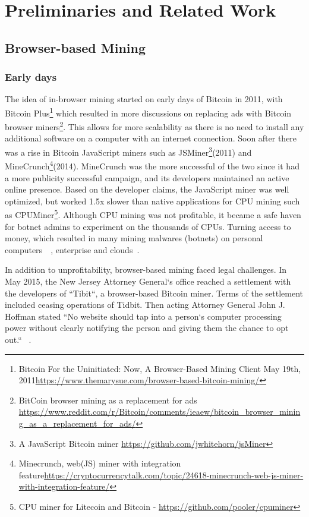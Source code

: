 
\section{Preliminaries and Related Work}

\subsection{Browser-based Mining}

\subsubsection{Early days}
The idea of in-browser mining started on early days of Bitcoin in 2011, with Bitcoin Plus\footnote{Bitcoin For the Uninitiated: Now, A Browser-Based Mining Client  May 19th, 2011\url{https://www.themarysue.com/browser-based-bitcoin-mining/}} which resulted in more discussions on replacing ads with Bitcoin browser miners\footnote{BitCoin browser mining as a replacement for ads \url{https://www.reddit.com/r/Bitcoin/comments/ieaew/bitcoin_browser_mining_as_a_replacement_for_ads/}}. This allows for more scalability as there is no need to install any additional software on a computer with an internet connection. Soon after there was a rise in Bitcoin JavaScript miners such as JSMiner\footnote{A JavaScript Bitcoin miner \url{https://github.com/jwhitehorn/jsMiner}}(2011) and MineCrunch\footnote{Minecrunch, web(JS) miner with integration feature\url{https://cryptocurrencytalk.com/topic/24618-minecrunch-web-js-miner-with-integration-feature/}}(2014). MineCrunch was the more successful of the two since it had a more publicity successful campaign, and its developers maintained an active online presence. Based on the developer claims, the JavaScript miner was well optimized, but worked 1.5x slower than native applications for CPU mining such as CPUMiner\footnote{CPU miner for Litecoin and Bitcoin - \url{https://github.com/pooler/cpuminer}}. Although CPU mining was not profitable, it became a safe haven for botnet admins to experiment on the thousands of CPUs. Turning access to money, which resulted in many mining malwares (botnets) on personal computers~\cite{huang2014botcoin}~\cite{wyke2012zeroaccess}, enterprise and clouds~\cite{MiningonSOeDime2017}.

In addition to unprofitability, browser-based mining faced legal challenges. In May 2015, the New Jersey Attorney General`s office reached a settlement with the developers of ``Tibit``, a browser-based Bitcoin miner. Terms of the settlement included ceasing operations of Tidbit. Then acting Attorney General John J. Hoffman stated ``No website should tap into a person`s computer processing power without clearly notifying the person and giving them the chance to opt out.`` ~\cite{njcourtbitcoinjsminer}.

